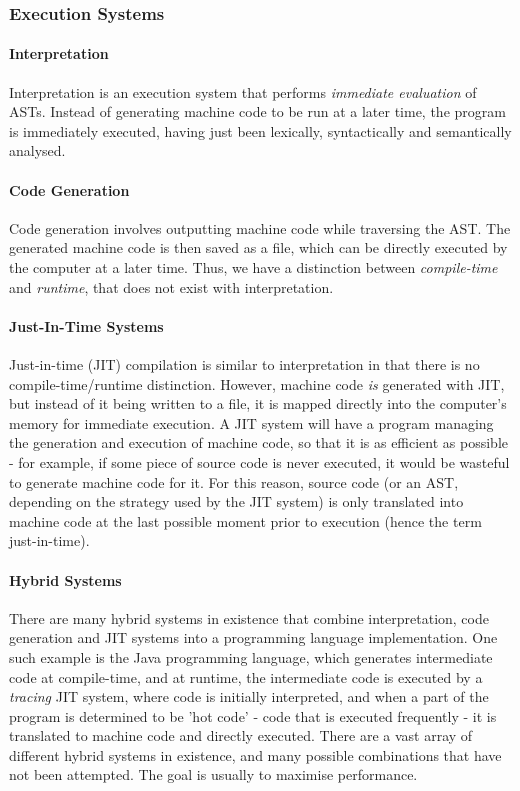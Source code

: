 \documentclass{article}
\begin{document}
\subsubsection{Execution Systems}
\paragraph{Interpretation \\}
Interpretation is an execution system that performs \emph{immediate evaluation} of ASTs. Instead of generating machine code to be run at a later time, the program is immediately executed, having just been lexically, syntactically and semantically analysed.

\paragraph{Code Generation \\}
Code generation involves outputting machine code while traversing the AST. The generated machine code is then saved as a file, which can be directly executed by the computer at a later time. Thus, we have a distinction between \emph{compile-time} and \emph{runtime}, that does not exist with interpretation.

\paragraph{Just-In-Time Systems \\}
Just-in-time (JIT) compilation is similar to interpretation in that there is no compile-time/runtime distinction. However, machine code \emph{is} generated with JIT, but instead of it being written to a file, it is mapped directly into the computer's memory for immediate execution. A JIT system will have a program managing the generation and execution of machine code, so that it is as efficient as possible - for example, if some piece of source code is never executed, it would be wasteful to generate machine code for it. For this reason, source code (or an AST, depending on the strategy used by the JIT system) is only translated into machine code at the last possible moment prior to execution (hence the term just-in-time).

\paragraph{Hybrid Systems \\}
There are many hybrid systems in existence that combine interpretation, code generation and JIT systems into a programming language implementation. One such example is the Java programming language, which generates intermediate code at compile-time, and at runtime, the intermediate code is executed by a \emph{tracing} JIT system, where code is initially interpreted, and when a part of the program is determined to be 'hot code' - code that is executed frequently - it is translated to machine code and directly executed. There are a vast array of different hybrid systems in existence, and many possible combinations that have not been attempted. The goal is usually to maximise performance.
\end{document}
